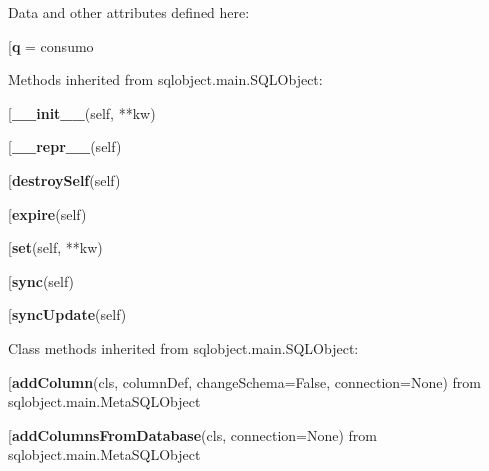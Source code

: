 Data and other attributes defined here:\\
\begin{description}\item[{\bf q} = consumo\end{description}


Methods inherited from sqlobject.main.SQLObject:\\
\begin{description}\item[{\bf \_\_init\_\_}(self, **kw)\end{description}

\begin{description}\item[{\bf \_\_repr\_\_}(self)\end{description}

\begin{description}\item[{\bf destroySelf}(self)\end{description}

\begin{description}\item[{\bf expire}(self)\end{description}

\begin{description}\item[{\bf set}(self, **kw)\end{description}

\begin{description}\item[{\bf sync}(self)\end{description}

\begin{description}\item[{\bf syncUpdate}(self)\end{description}


Class methods inherited from sqlobject.main.SQLObject:\\
\begin{description}\item[{\bf addColumn}(cls, columnDef, changeSchema=False, connection=None) from sqlobject.main.MetaSQLObject\end{description}

\begin{description}\item[{\bf addColumnsFromDatabase}(cls, connection=None) from sqlobject.main.MetaSQLObject\end{description}

